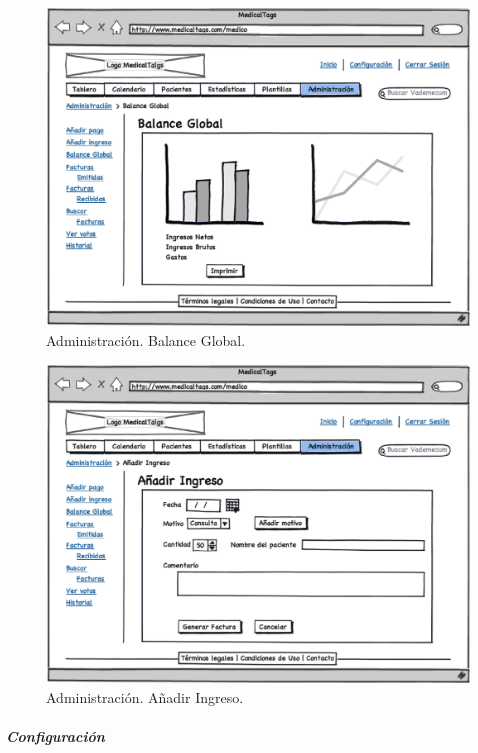 \documentclass[a4paper,oneside,11pt]{book}
\begin{document}
		
		\begin{figure}[H]
		  \centering
		    \includegraphics[width=12cm]{img/eps/21_Administracion_Medico2.eps}
		  \caption{Administración. Balance Global.}
		  \label{fig:administracion_balance}
		\end{figure}
		
		\begin{figure}[H]
		  \centering
		    \includegraphics[width=12cm]{img/eps/22_Administracion_Medico1.eps}
		  \caption{Administración. Añadir Ingreso.}
		  \label{fig:administracion_ingreso}
		\end{figure}
				
		
		\subparagraph{Configuración} %
		\label{par:medico_configuracion}
		
\end{document}
